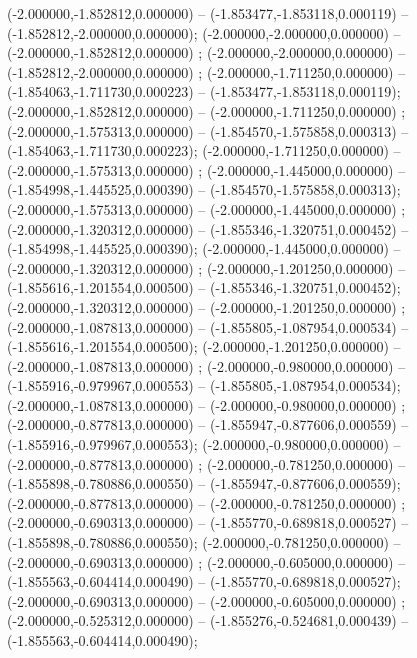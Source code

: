 (-2.000000,-1.852812,0.000000) -- (-1.853477,-1.853118,0.000119) -- (-1.852812,-2.000000,0.000000);
 (-2.000000,-2.000000,0.000000) -- (-2.000000,-1.852812,0.000000) ;
 (-2.000000,-2.000000,0.000000) -- (-1.852812,-2.000000,0.000000) ;
 (-2.000000,-1.711250,0.000000) -- (-1.854063,-1.711730,0.000223) -- (-1.853477,-1.853118,0.000119);
 (-2.000000,-1.852812,0.000000) -- (-2.000000,-1.711250,0.000000) ;
 (-2.000000,-1.575313,0.000000) -- (-1.854570,-1.575858,0.000313) -- (-1.854063,-1.711730,0.000223);
 (-2.000000,-1.711250,0.000000) -- (-2.000000,-1.575313,0.000000) ;
 (-2.000000,-1.445000,0.000000) -- (-1.854998,-1.445525,0.000390) -- (-1.854570,-1.575858,0.000313);
 (-2.000000,-1.575313,0.000000) -- (-2.000000,-1.445000,0.000000) ;
 (-2.000000,-1.320312,0.000000) -- (-1.855346,-1.320751,0.000452) -- (-1.854998,-1.445525,0.000390);
 (-2.000000,-1.445000,0.000000) -- (-2.000000,-1.320312,0.000000) ;
 (-2.000000,-1.201250,0.000000) -- (-1.855616,-1.201554,0.000500) -- (-1.855346,-1.320751,0.000452);
 (-2.000000,-1.320312,0.000000) -- (-2.000000,-1.201250,0.000000) ;
 (-2.000000,-1.087813,0.000000) -- (-1.855805,-1.087954,0.000534) -- (-1.855616,-1.201554,0.000500);
 (-2.000000,-1.201250,0.000000) -- (-2.000000,-1.087813,0.000000) ;
 (-2.000000,-0.980000,0.000000) -- (-1.855916,-0.979967,0.000553) -- (-1.855805,-1.087954,0.000534);
 (-2.000000,-1.087813,0.000000) -- (-2.000000,-0.980000,0.000000) ;
 (-2.000000,-0.877813,0.000000) -- (-1.855947,-0.877606,0.000559) -- (-1.855916,-0.979967,0.000553);
 (-2.000000,-0.980000,0.000000) -- (-2.000000,-0.877813,0.000000) ;
 (-2.000000,-0.781250,0.000000) -- (-1.855898,-0.780886,0.000550) -- (-1.855947,-0.877606,0.000559);
 (-2.000000,-0.877813,0.000000) -- (-2.000000,-0.781250,0.000000) ;
 (-2.000000,-0.690313,0.000000) -- (-1.855770,-0.689818,0.000527) -- (-1.855898,-0.780886,0.000550);
 (-2.000000,-0.781250,0.000000) -- (-2.000000,-0.690313,0.000000) ;
 (-2.000000,-0.605000,0.000000) -- (-1.855563,-0.604414,0.000490) -- (-1.855770,-0.689818,0.000527);
 (-2.000000,-0.690313,0.000000) -- (-2.000000,-0.605000,0.000000) ;
 (-2.000000,-0.525312,0.000000) -- (-1.855276,-0.524681,0.000439) -- (-1.855563,-0.604414,0.000490);
